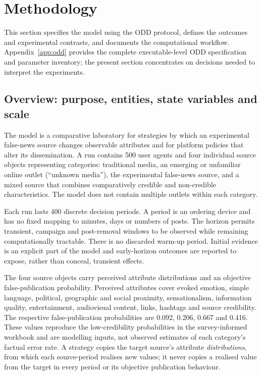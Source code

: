 \section{Methodology}

This section specifies the model using the ODD protocol, defines the outcomes and experimental contrasts, and documents the computational workflow. Appendix~\ref{app:odd} provides the complete executable-level ODD specification and parameter inventory; the present section concentrates on decisions needed to interpret the experiments.

\subsection{Overview: purpose, entities, state variables and scale}

The model is a comparative laboratory for strategies by which an experimental false-news source changes observable attributes and for platform policies that alter its dissemination. A run contains 500 user agents and four individual source objects representing categories: traditional media, an emerging or unfamiliar online outlet (``unknown media''), the experimental false-news source, and a mixed source that combines comparatively credible and non-credible characteristics. The model does not contain multiple outlets within each category.

Each run lasts 400 discrete decision periods. A period is an ordering device and has no fixed mapping to minutes, days or numbers of posts. The horizon permits transient, campaign and post-removal windows to be observed while remaining computationally tractable. There is no discarded warm-up period. Initial evidence is an explicit part of the model and early-horizon outcomes are reported to expose, rather than conceal, transient effects.

The four source objects carry perceived attribute distributions and an objective false-publication probability. Perceived attributes cover evoked emotion, simple language, political, geographic and social proximity, sensationalism, information quality, entertainment, audiovisual content, links, hashtags and source credibility. The respective false-publication probabilities are 0.092, 0.206, 0.667 and 0.416. These values reproduce the low-credibility probabilities in the survey-informed workbook and are modelling inputs, not observed estimates of each category's factual error rate. A strategy copies the target source's attribute \emph{distributions}, from which each source-period realises new values; it never copies a realised value from the target in every period or its objective publication behaviour.

